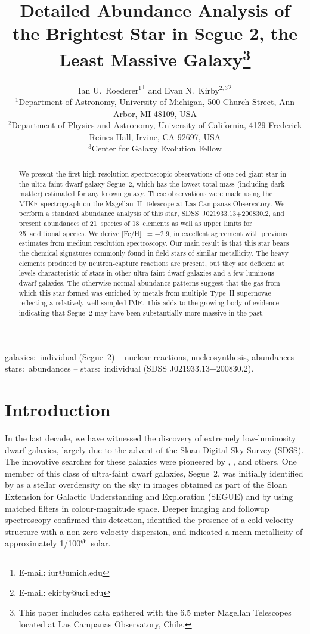 \documentclass[useAMS,usenatbib,usegraphicx]{mn2e}
\title[Abundances in Segue 2]
{Detailed Abundance Analysis of the Brightest Star in Segue 2,
the Least Massive Galaxy\thanks{
This paper includes data gathered with the 6.5 meter 
Magellan Telescopes located at Las Campanas Observatory, Chile.}
}
\author[Ian U.\ Roederer and Evan N.\ Kirby]{%
Ian U.\ Roederer$^{1}$\thanks{E-mail: iur@umich.edu} 
%
and
%
Evan N.\ Kirby$^{2,3}$\thanks{E-mail: ekirby@uci.edu}\\
%
$^{1}$Department of Astronomy, University of Michigan,
500 Church Street, Ann Arbor, MI 48109, USA\\
%
$^{2}$Department of Physics and Astronomy, University of California,
4129 Frederick Reines Hall, Irvine, CA 92697, USA\\
%
$^{3}$Center for Galaxy Evolution Fellow
}
\def\seggal{\mbox{Segue~2}}
\begin{document}
\pagerange{\pageref{firstpage}--\pageref{lastpage}} 
\maketitle
\label{firstpage}

\begin{abstract}

We present the first high resolution spectroscopic observations of
one red giant star in the ultra-faint dwarf galaxy Segue~2, 
which has the lowest total mass 
(including dark matter) estimated for any known galaxy.
These observations were made using the 
MIKE spectrograph on the Magellan~II Telescope
at Las Campanas Observatory.
We perform a standard abundance analysis of this star,
SDSS~J021933.13$+$200830.2,
and present abundances of 21~species of 18~elements
as well as upper limits for 25~additional species.
We derive [Fe/H]~$= -$2.9, in excellent agreement with
previous estimates from medium resolution spectroscopy.
Our main result is that this star 
bears the chemical signatures
commonly found in field stars of similar metallicity.
The heavy elements produced by neutron-capture reactions
are present, but they are deficient at levels
characteristic of stars in other ultra-faint dwarf galaxies
and a few luminous dwarf galaxies.
The otherwise normal abundance patterns suggest
that the gas from which this star formed was enriched
by metals from multiple Type~II supernovae reflecting 
a relatively well-sampled IMF.
This adds to the growing body of evidence
indicating that Segue~2 may have been
substantially more massive in the past.

\end{abstract}


\begin{keywords}
galaxies:\ individual (Segue~2) --
nuclear reactions, nucleosynthesis, abundances --
stars:\ abundances --
stars:\ individual (SDSS J021933.13+200830.2).
\end{keywords}



\section{Introduction}
\label{introduction}


In the last decade, we have witnessed the discovery of 
extremely low-luminosity dwarf galaxies, largely due to the
advent of the Sloan Digital Sky Survey (SDSS).  
The innovative
searches for these galaxies were pioneered by
\citet{willman05}, \citet{belokurov07}, and others.
One member of this class of ultra-faint dwarf galaxies,
\seggal, was initially identified by \citet{belokurov09}
as a stellar overdensity on the sky 
in images obtained as part of the 
Sloan Extension for Galactic Understanding and Exploration (SEGUE)
and by using matched filters in colour-magnitude space.
Deeper imaging and followup spectroscopy confirmed this detection,
identified the presence of a cold velocity structure
with a non-zero velocity dispersion,
and indicated a mean metallicity of approximately 1/100$^{\rm th}$
solar.
\end{document}

